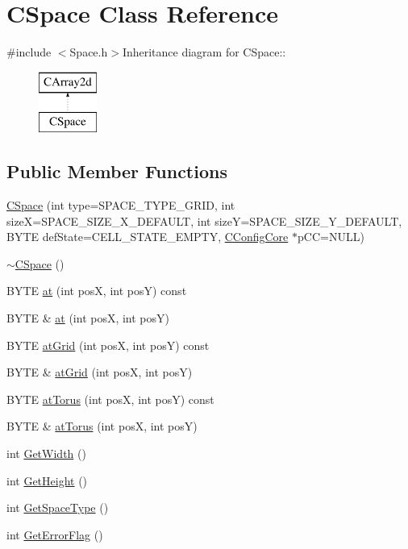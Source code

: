\hypertarget{classCSpace}{
\section{CSpace Class Reference}
\label{classCSpace}
}


{\ttfamily \#include $<$Space.h$>$}Inheritance diagram for CSpace::\begin{figure}[H]
\begin{center}
\leavevmode
\includegraphics[height=2cm]{classCSpace}
\end{center}
\end{figure}
\subsection*{Public Member Functions}
\begin{DoxyCompactItemize}
\item 
\hyperlink{classCSpace_ab795395372f17e257fa72988e10b206f}{CSpace} (int type=SPACE\_\-TYPE\_\-GRID, int sizeX=SPACE\_\-SIZE\_\-X\_\-DEFAULT, int sizeY=SPACE\_\-SIZE\_\-Y\_\-DEFAULT, BYTE defState=CELL\_\-STATE\_\-EMPTY, \hyperlink{classCConfigCore}{CConfigCore} $\ast$pCC=NULL)
\item 
\hyperlink{classCSpace_a6315ca8443a78458dca1ba8f2b8cf60d}{$\sim$CSpace} ()
\item 
BYTE \hyperlink{classCSpace_a670a753794c1e851cc337f2f312c2538}{at} (int posX, int posY) const 
\item 
BYTE \& \hyperlink{classCSpace_abfac3ba5b7bf020e658b2a52ebcb7f36}{at} (int posX, int posY)
\item 
BYTE \hyperlink{classCSpace_a83689b4589c9f5c8d41931e830d302a1}{atGrid} (int posX, int posY) const 
\item 
BYTE \& \hyperlink{classCSpace_a2ad446a5bb454b65212430b71980a70e}{atGrid} (int posX, int posY)
\item 
BYTE \hyperlink{classCSpace_a7c0381e6e90fc56a8213fba4b047649e}{atTorus} (int posX, int posY) const 
\item 
BYTE \& \hyperlink{classCSpace_a1e2364f59e8dcacd46a5f96d878ca349}{atTorus} (int posX, int posY)
\item 
int \hyperlink{classCSpace_a0358e524cecae683cfbcf526ea99d818}{GetWidth} ()
\item 
int \hyperlink{classCSpace_a00b9bce5ca8303b7bae59e2ab6ce98be}{GetHeight} ()
\item 
int \hyperlink{classCSpace_ae700fc8fa63e62dd559245e832614c65}{GetSpaceType} ()
\item 
int \hyperlink{classCSpace_afe1840ea70f14055a39090ceaec9778e}{GetErrorFlag} ()
\end{DoxyCompactItemize}
